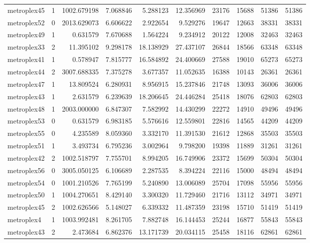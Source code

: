 \begin{longtable}{|l|r|r|r|r|r|r|r|r|r|}
metroplex45 & 1 & 1002.679198 & 7.068846 & 5.288123 & 12.356969 & 23176 & 15688 & 51386 & 51386 \\
metroplex52 & 0 & 2013.629073 & 6.606622 & 2.922654 & 9.529276 & 19647 & 12663 & 38331 & 38331 \\
metroplex49 & 1 & 0.631579 & 7.670688 & 1.564224 & 9.234912 & 20122 & 12008 & 32463 & 32463 \\
metroplex33 & 2 & 11.395102 & 9.298178 & 18.138929 & 27.437107 & 26844 & 18566 & 63348 & 63348 \\
metroplex41 & 1 & 0.578947 & 7.815777 & 16.584892 & 24.400669 & 27588 & 19010 & 65273 & 65273 \\
metroplex44 & 2 & 3007.688335 & 7.375278 & 3.677357 & 11.052635 & 16388 & 10143 & 26361 & 26361 \\
metroplex47 & 1 & 13.809524 & 6.280931 & 8.956915 & 15.237846 & 21748 & 13093 & 36006 & 36006 \\
metroplex43 & 1 & 2.631579 & 6.239639 & 18.206645 & 24.446284 & 25418 & 18076 & 62803 & 62803 \\
metroplex48 & 1 & 2003.000000 & 6.847307 & 7.582992 & 14.430299 & 22272 & 14910 & 49496 & 49496 \\
metroplex53 & 0 & 0.631579 & 6.983185 & 5.576616 & 12.559801 & 22816 & 14565 & 44209 & 44209 \\
metroplex55 & 0 & 4.235589 & 8.059360 & 3.332170 & 11.391530 & 21612 & 12868 & 35503 & 35503 \\
metroplex51 & 1 & 3.493734 & 6.795236 & 3.002964 & 9.798200 & 19398 & 11889 & 31261 & 31261 \\
metroplex42 & 2 & 1002.518797 & 7.755701 & 8.994205 & 16.749906 & 23372 & 15699 & 50304 & 50304 \\
metroplex56 & 0 & 3005.050125 & 6.106689 & 2.287535 & 8.394224 & 22116 & 15000 & 48494 & 48494 \\
metroplex54 & 0 & 1001.210526 & 7.765199 & 5.240890 & 13.006089 & 25704 & 17098 & 55956 & 55956 \\
metroplex50 & 1 & 1004.270651 & 8.429140 & 3.300320 & 11.729460 & 21716 & 13112 & 34971 & 34971 \\
metroplex45 & 2 & 1002.626566 & 5.148027 & 6.339332 & 11.487359 & 23198 & 15710 & 51419 & 51419 \\
metroplex4 & 1 & 1003.992481 & 8.261705 & 7.882748 & 16.144453 & 25244 & 16877 & 55843 & 55843 \\
metroplex43 & 2 & 2.473684 & 6.862376 & 13.171739 & 20.034115 & 25458 & 18116 & 62861 & 62861 \\

\end{longtable}
